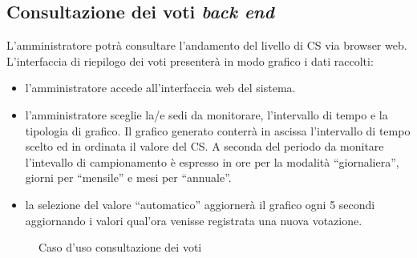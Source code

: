 \subsection{Consultazione dei voti \emph{back end}}
L'amministratore potrà consultare l'andamento del livello di \acf{CS} via
browser web.
L’interfaccia di riepilogo dei voti presenterà in modo graﬁco i dati raccolti:
\begin{itemize}
  \item l'amministratore accede all'interfaccia web del sistema.
  \item l'amministratore sceglie la/e sedi da monitorare, l'intervallo di
  tempo e la tipologia di grafico. Il grafico generato conterrà in ascissa
  l'intervallo di tempo scelto ed in ordinata il valore del \ac{CS}. A seconda
  del periodo da monitare l'intevallo di campionamento è espresso in ore per la
  modalità ``giornaliera'', giorni per ``mensile'' e mesi per
  ``annuale''.
  \item la selezione del valore ``automatico'' aggiornerà il grafico ogni 5
  secondi aggiornando i valori qual'ora venisse registrata una nuova votazione.
\end{itemize}

\begin{figure}[!h]
  \centering
  \caption{Caso d'uso consultazione dei voti}
  \label{fig::usecase-monitoring}
\end{figure}
